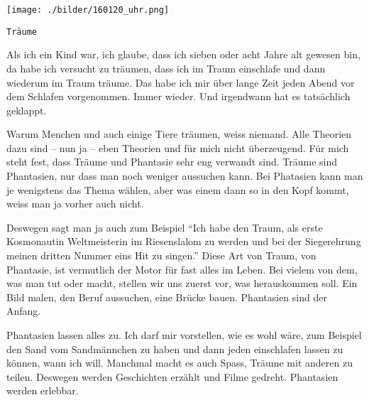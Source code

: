 \thispagestyle{empty}
\begin{center}
\texttt{[image: ./bilder/160120\_uhr.png]}
\end{center}
\vskip 2cm
{\Huge\color{farbe}\hfill{\tt{Träume}}}
\newpage
\lettrine[lines=2, lhang=.2, loversize=.25, lraise=0.05, findent=0.1em,
nindent=0em]{A}{}ls ich ein Kind war, ich glaube, dass ich sieben oder acht
Jahre alt gewesen bin, da habe ich versucht zu träumen, dass ich im Traum
einschlafe und dann wiederum im Traum träume. Das habe ich mir über lange Zeit
jeden Abend vor dem Schlafen vorgenommen. Immer wieder. Und irgendwann hat es
tatsächlich geklappt.

Warum Menchen und auch einige Tiere träumen, weiss niemand. Alle Theorien dazu
sind -- nun ja -- eben Theorien und für mich nicht überzeugend. Für mich steht
fest, dass Träume und Phantasie sehr eng verwandt sind. Träume sind Phantasien,
nur dass man noch weniger aussuchen kann. Bei Phatasien kann man je wenigstens
das Thema wählen, aber was einem dann so in den Kopf kommt, weiss man ja vorher
auch nicht. 

Deswegen sagt man ja auch zum Beispiel \enquote{Ich habe den Traum, als erste
Kosmonautin Weltmeisterin im Riesenslalom zu werden und bei der Siegerehrung meinen
dritten Nummer eins Hit zu singen.} Diese Art von Traum, von Phantasie, ist
vermutlich der Motor für fast alles im Leben. Bei vielem von dem, was man tut oder macht,
stellen wir uns zuerst vor, was herauskommen soll. Ein Bild malen, den Beruf
aussuchen, eine Brücke bauen. Phantasien sind der Anfang.

Phantasien lassen alles zu. Ich darf mir vorstellen, wie es wohl wäre, zum
Beispiel den Sand vom Sandmännchen zu haben und dann jeden einschlafen lassen
zu können, wann ich will. Manchmal macht es auch Spass, Träume mit anderen zu
teilen. Deswegen werden Geschichten erzählt und Filme gedreht. Phantasien
werden erlebbar. 
\vfill


